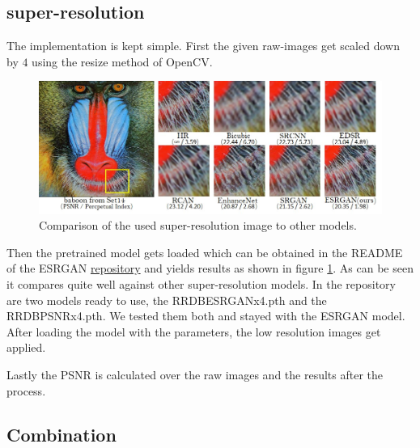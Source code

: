\subsection{super-resolution}

The implementation is kept simple. First the given raw-images get scaled down by $4$ using the resize method of OpenCV.

\begin{figure}[ht!]
    \begin{center}
        \includegraphics[scale=.44]{resources/qualitative_cmp_01.jpg}
        \caption{Comparison of the used super-resolution image to other models. \cite{ape_bib}} \label{ape}
    \end{center}
\end{figure}

Then the pretrained model gets loaded which can be obtained in the README of the ESRGAN \href{https://github.com/xinntao/ESRGAN}{repository} and yields results as shown in figure \ref*{ape}. As can be seen it compares quite well against other super-resolution models. In the repository are two models ready to use, the RRDB\textunderscore ESRGAN\textunderscore x4.pth and the RRDB\textunderscore PSNR\textunderscore x4.pth. We tested them both and stayed with the ESRGAN model. After loading the model with the parameters, the low resolution images get applied.

Lastly the PSNR is calculated over the raw images and the results after the process.

\subsection{Combination}

